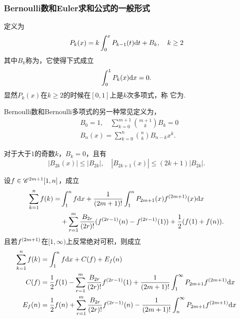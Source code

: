   \subsubsection{Bernoulli数和Euler求和公式的一般形式}
    \begin{defi}
      定义为
      \begin{equation}
          P_k(x) = k\int_0^x P_{k-1}(t)\mathrm{d} t + B_k,\quad k\ge 2
      \end{equation}
      其中$B_k$称为，它使得下式成立
      \[
        \int_0^1P_k(x)\mathrm{d} x = 0.
      \]
      显然$P_k(x)$在$k\ge 2$的时候在$[0, 1]$上是$k$次多项式，称
      它为.
    \end{defi}

    \begin{thm}[等价定义]
      Bernoulli数和Bernoulli多项式的另一种常见定义为，
      \[\begin{split}
        & B_0 = 1,\quad \sum_{k=0}^{m+1} {{m+1}\choose{k}} B_k = 0 \\
        & B_n(x) = \sum_{k=0}^n{{n}\choose{k}}B_{n-k}x^k.
      \end{split}\]
    \end{thm}
    \remark
      对于大于$1$的奇数$k$，$B_k=0$，且有
      \[
        |B_{2k}(x)| \le |B_{2k}|,\quad
        |B_{2k+1}(x)| \le (2k+1)|B_{2k}|.
      \]

    \begin{thm}[Euler求和公式的一般形式]
      设$\mathnormal{f}\in\mathscr{C}^{2m+1}[1, n]$，成立
      \[\begin{split}
        \sum_{k=1}^n\mathnormal{f}(k) = & \int_1^n\mathnormal{f}\mathrm{d} x +
        \frac{1}{(2m+1)!}\int_1^n P_{2m+1}(x)\mathnormal{f}^{(2m+1)}(x)\mathrm{d} x\\
        & + \sum_{r=1}^m \frac{B_{2r}}{(2r)!}(\mathnormal{f}^{(2r-1)}(n)-\mathnormal{f}^{(2r-1)}(1))
        + \frac{1}{2}(\mathnormal{f}(1) + \mathnormal{f}(n)).
      \end{split}\]
      且若$\mathnormal{f}^{(2m+1)}$在$[1, \infty)$上反常绝对可积，则成立
      \[\begin{split}
      \sum_{k=1}^n\mathnormal{f}(k) &= \int_1^n\mathnormal{f}\mathrm{d} x + C(\mathnormal{f}) + E_{\mathnormal{f}}(n) \\
      C(\mathnormal{f}) &= \frac{1}{2}\mathnormal{f}(1) - \sum_{r=1}^m\frac{B_{2r}}{(2r)!}\mathnormal{f}^{(2r-1)}(1)
      + \frac{1}{(2m+1)!}\int_1^{\infty}P_{2m+1}\mathnormal{f}^{(2m+1)}\mathrm{d} x \\
      E_{\mathnormal{f}}(n) &= \frac{1}{2}\mathnormal{f}(n) + \sum_{r=1}^m\frac{B_{2r}}{(2r)!}\mathnormal{f}^{(2r-1)}(n)
      - \frac{1}{(2m+1)!}\int_n^{\infty}P_{2m+1}\mathnormal{f}^{(2m+1)}\mathrm{d} x
      \end{split}\]
    \end{thm}
